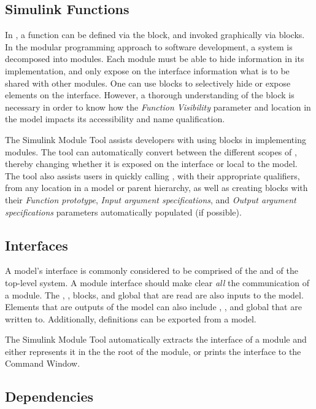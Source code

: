 \documentclass{article}
\makeatletter
\newcommand{\ToolName}{Simulink Module Tool\@\xspace}
\makeatother
\begin{document}
\subsection{Simulink Functions}
In \Simulink, a function can be defined via the \simfunc block, and invoked graphically via \simfunccaller blocks. In the modular programming approach to software development, a system is decomposed into modules. Each module must be able to hide information in its implementation, and only expose on the interface information what is to be shared with other modules. One can use \simfunc blocks to selectively hide or expose elements on the interface. However, a thorough understanding of the \simfunc block is necessary in order to know how the \emph{Function Visibility} parameter and location in the model impacts its accessibility and name qualification. 

The \ToolName assists developers with using \simfunc blocks in implementing \Simulink modules. The tool can automatically convert between the different scopes of , thereby changing whether it is exposed on the interface or local to the model. The tool also assists users in quickly calling , with their appropriate qualifiers, from any location in a model or parent hierarchy, as well as creating \simfunccaller blocks with their \emph{Function prototype}, \emph{Input argument specifications}, and \emph{Output argument specifications} parameters automatically populated (if possible).

\subsection{Interfaces}
A \Simulink model's interface is commonly considered to be comprised of the  and  of the top-level system. A module interface should make clear \emph{all} the communication of a module. The \fromfile, \fromspreadsheet, \fromworkspace blocks, and global  that are read are also inputs to the model. Elements that are outputs of the model can also include \toworkspace, \tofile, and global  that are written to. Additionally, \simfunc definitions can be exported from a model. %

The \ToolName automatically extracts the interface of a \Simulink module and either represents it in the the root of the \Simulink module, or prints the interface to the Command Window.

\subsection{Dependencies}
\end{document}
